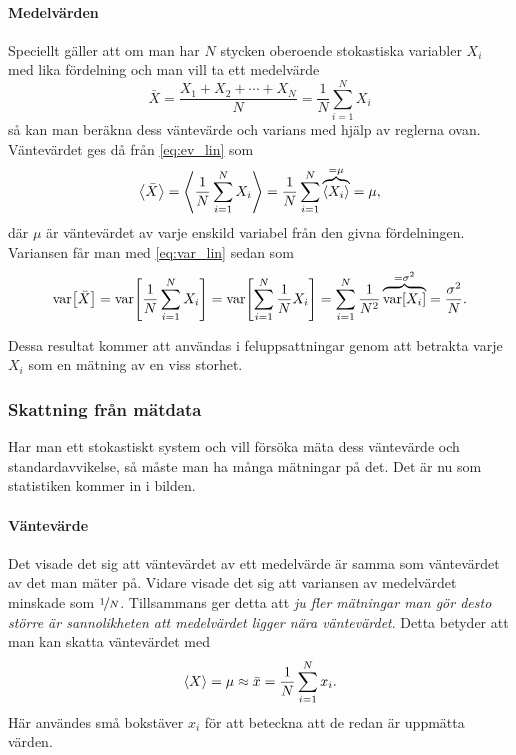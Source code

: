 \documentclass[11pt,a4paper, swedish
]{article}
\newcommand{\VAR}[1]{\ensuremath\text{var}\!\left[#1\right]}
\begin{document}
\paragraph{Medelvärden}
Speciellt gäller att om man har $N$ stycken oberoende stokastiska variabler
$X_i$ med lika fördelning och man vill ta ett medelvärde 
\begin{equation} 
\bar{X} = \frac{X_1+X_2+\cdots+X_N}{N} = \frac{1}{N}\sum_{i=1}^N X_i
\end{equation}
så kan man beräkna dess väntevärde och varians med hjälp av reglerna
ovan. 
Väntevärdet ges då från \eqref{eq:ev_lin} som
\begin{equation}\label{eq:ev_mean}
\ev{\bar{X}} = \ev{\frac{1}{N} \sum_{i=1}^N X_i} 
= \frac{1}{N} \sum_{i=1}^N \overbrace{\ev{X_i}}^{=\mu} 
= \mu,
\end{equation}
där $\mu$ är väntevärdet av varje enskild variabel från den givna
fördelningen. 
Variansen får man med \eqref{eq:var_lin} sedan som
\begin{equation}\label{eq:var_mean}
\VAR{\bar{X}} = \VAR{\frac{1}{N} \sum_{i=1}^N X_i}
= \VAR{\sum_{i=1}^N \frac{1}{N} X_i}
= \sum_{i=1}^N \frac{1}{N^2}\overbrace{\VAR{X_i}}^{=\sigma^2}
= \frac{\sigma^2}{N}.
\end{equation}

Dessa resultat kommer att användas i feluppsattningar genom att
betrakta varje $X_i$ som en mätning av en viss storhet.


\subsubsection{Skattning från mätdata}
Har man ett stokastiskt system och vill försöka mäta dess väntevärde
och standardavvikelse, så måste man ha många mätningar på det. Det är
nu som statistiken kommer in i bilden.

\paragraph{Väntevärde}
Det visade det sig att väntevärdet av ett medelvärde är samma som
väntevärdet av det man mäter på. Vidare visade det sig att variansen
av medelvärdet minskade som $\nicefrac{1}{N}$. Tillsammans ger detta
att \emph{ju fler mätningar man gör desto större är sannolikheten att
  medelvärdet ligger nära väntevärdet}.  
Detta betyder att man kan skatta väntevärdet med
\begin{equation}\label{eq:ev_approx}
\ev{X} = \mu \approx \bar{x} = \frac{1}{N}\sum_{i=1}^N x_i.
\end{equation}
Här användes små bokstäver $x_i$ för att beteckna att de redan är
uppmätta värden.
\end{document}
